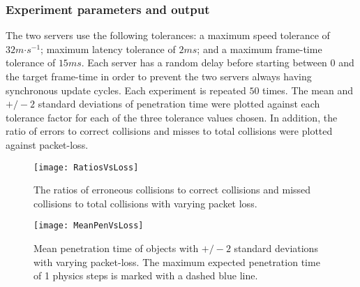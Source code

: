 \subsubsection{Experiment parameters and output}
The two servers use the following tolerances: a maximum speed tolerance of $32m\mathord{\cdot}s^{-1}$; maximum latency tolerance of $2ms$; and a maximum frame-time tolerance of $15ms$. Each server has a random delay before starting between $0$ and the target frame-time in order to prevent the two servers always having synchronous update cycles. Each experiment is repeated $50$ times. The mean and $+/-2$ standard deviations of penetration time were plotted against each tolerance factor for each of the three tolerance values chosen. In addition, the ratio of errors to correct collisions and misses to total collisions were plotted against packet-loss.

\begin{figure}
	\centering
	\texttt{[image: RatiosVsLoss]}
	\caption{The ratios of erroneous collisions to correct collisions and missed collisions to total collisions with varying packet loss.} %
	\label{fig_RatiosVsLoss}
\end{figure}

\begin{figure}
\texttt{[image: MeanPenVsLoss]}
\caption{Mean penetration time of objects with $+/-2$ standard deviations with varying packet-loss. The maximum expected penetration time of 1 physics steps is marked with a dashed blue line.}
\label{fig_CollisionsPenVsLoss}
\end{figure}

